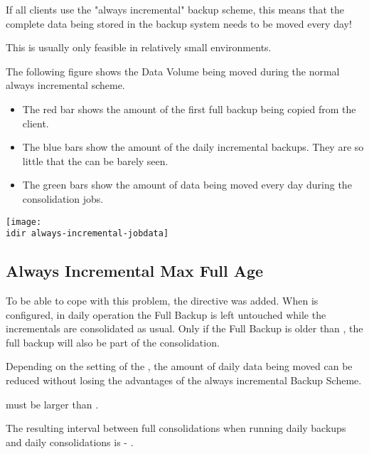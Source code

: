 If all clients use the "always incremental" backup scheme, this means that the complete data being stored in the backup system needs to be moved every day!

This is usually only feasible in relatively small environments.

The following figure shows the Data Volume being moved during the normal always incremental scheme.
\begin{itemize}
    \item The red bar shows the amount of the first full backup being copied from the client.
    \item The blue bars show the amount of the daily incremental backups. They are so little that the can be barely seen.
    \item The green bars show the amount of data being moved every day during the consolidation jobs.
\end{itemize}

\begin{center}
\texttt{[image: \\idir always-incremental-jobdata]}
\end{center}



\subsection{Always Incremental Max Full Age}
\label{sec:AlwaysIncrementalMaxFullAge}

To be able to cope with this problem, the directive  was added.
When  is configured,
in daily operation the Full Backup is left untouched while the incrementals are consolidated as usual. 
Only if the Full Backup is older than ,
the full backup will also be part of the consolidation.

Depending on the setting of the ,
the amount of daily data being moved can be reduced without losing the advantages of the always incremental Backup Scheme.

 must be larger than .

The resulting interval between full consolidations when running daily backups
and daily consolidations is  - .

